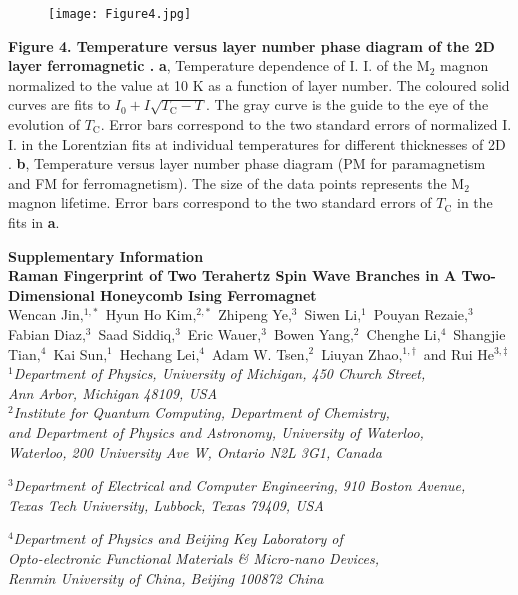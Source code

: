 \documentclass[prl, preprint, superscriptaddress]{revtex4-1}
\begin{document}
\newpage
\begin{figure}
\texttt{[image: Figure4.jpg]}
\end{figure}
\begin{footnotesize}
\noindent\textbf{Figure 4. Temperature versus layer number phase diagram of the 2D layer ferromagnetic .} \textbf{a}, Temperature dependence of I. I. of the $\mathrm{M_2}$ magnon normalized to the value at 10 K as a function of layer number. The coloured solid curves are fits to $I_0+I\sqrt{T_\mathrm{C}-T}$. The gray curve is the guide to the eye of the evolution of $T_\mathrm{C}$. Error bars correspond to the two standard errors of normalized I. I. in the Lorentzian fits at individual temperatures for different thicknesses of 2D . \textbf{b}, Temperature versus layer number phase diagram (PM for paramagnetism and FM for ferromagnetism). The size of the data points represents the $\mathrm{M_2}$ magnon lifetime. Error bars correspond to the two standard errors of $T_\mathrm{C}$ in the fits in \textbf{a}. 
\end{footnotesize}

\newpage

\begin{center}
\textbf{Supplementary Information}\\

\vspace{12pt}
\textbf{Raman Fingerprint of Two Terahertz Spin Wave Branches in A Two-Dimensional Honeycomb Ising Ferromagnet}\\

Wencan Jin$,^{1,\ast}$ Hyun Ho Kim$,^{2,\ast}$ Zhipeng Ye$,^3$ Siwen Li$,^1$ Pouyan Rezaie$,^3$ Fabian Diaz$,^3$ Saad Siddiq$,^3$ Eric Wauer$,^3$ Bowen Yang$,^2$ Chenghe Li$,^4$ Shangjie Tian$,^4$ Kai Sun$,^1$ Hechang Lei$,^4$ Adam W. Tsen$,^2$ Liuyan Zhao$,^{1, \dagger}$ and Rui He$^{3, \ddagger}$\\

\textit{$^1$Department of Physics, University of Michigan, 450 Church Street,\\ Ann Arbor, Michigan 48109, USA}\\

\textit{$^2$Institute for Quantum Computing, Department of Chemistry, \\and Department of Physics and Astronomy, University of Waterloo,\\ Waterloo, 200 University Ave W, Ontario N2L 3G1, Canada}

\textit{$^3$Department of Electrical and Computer Engineering, 910 Boston Avenue, \\Texas Tech University, Lubbock, Texas 79409, USA}

\textit{$^4$Department of Physics and Beijing Key Laboratory of \\Opto-electronic Functional Materials \& Micro-nano Devices, \\Renmin University of China, Beijing 100872 China}
\end{center}
\end{document}
